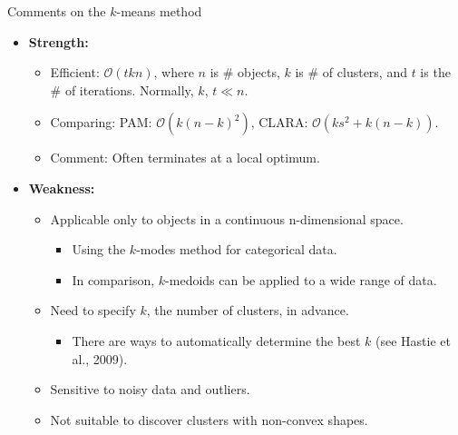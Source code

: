 \documentclass[aspectratio=169,t,xcolor=dvipsnames]{beamer}
\begin{document}
  {
    \begin{frame}{Comments on the $k$-means method}
      \begin{itemize}
        \item \textbf{Strength:}
        \begin{itemize}
          \item Efficient: $\mathcal{O}(tkn)$, where $n$ is $\#$ objects, $k$ is $\#$ of clusters, and $t$ is the $\#$ of iterations. Normally, $k$, $t \ll n$.
          \item Comparing: PAM: $\mathcal{O}(k(n-k)^2)$, CLARA: $\mathcal{O}(ks^2 + k(n-k))$.
          \item Comment: Often terminates at a local optimum.
        \end{itemize}
        \item \textbf{Weakness:}
        \begin{itemize}
          \item Applicable only to objects in a continuous n-dimensional space.
          \begin{itemize}
            \item Using the $k$-modes method for categorical data.
            \item In comparison, $k$-medoids can be applied to a wide range of data.
          \end{itemize}
          \item Need to specify $k$, the number of clusters, in advance.
          \begin{itemize}
            \item There are ways to automatically determine the best $k$ (see Hastie et al., 2009).
          \end{itemize}
          \item Sensitive to noisy data and outliers.
          \item Not suitable to discover clusters with non-convex shapes.
        \end{itemize}
      \end{itemize}
    \end{frame}
  }
\end{document}
